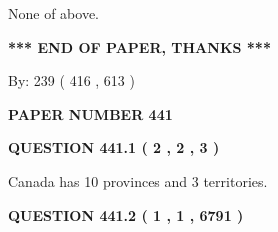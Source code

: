 \documentclass[12pt]{article}
\begin{document}
  
 
 
\noindent{}
 
 
 None of above.
 
 
 
 
   
   
 \vspace{0.2in}
 
   
   
   
   
\vspace{1.0in} 
{\textbf{\large{ *** END OF PAPER, THANKS *** }}} 
   
   
\hspace{1.0in} By: 
 239 ( 416 ,  613 )
   
   
   
   
\newpage 
\setcounter{page}{ 
   441001 } 
   
   
   
   
 {\textbf{ \Large{ PAPER NUMBER  441  }}}
   
   
\vspace{0.2in}
   
   
   
   
   
   
 \vspace{0.2in}
 
 
 
 
   
   
  
\vspace{0.2in}
  
{\textbf{\Large{QUESTION
441.1 
 ( 2 , 2 , 3 )
}}}
  
  
 
 
\noindent{}
 
 
Canada has 10  provinces and 3 territories.
 
 
 
 
  
\vspace{0.2in}
  
{\textbf{\Large{QUESTION
441.2 
 ( 1 , 1 , 6791 )
}}}
  
  
   
   
 \vspace{0.2in}
 
\end{document}
